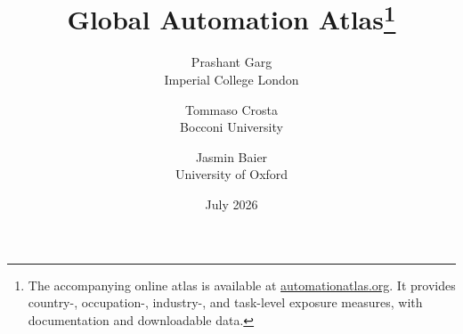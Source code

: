 \documentclass[11pt]{article}
\title{Global Automation Atlas\thanks{The accompanying online atlas is available at \href{https://automationatlas.org}{automationatlas.org}. It provides country-, occupation-, industry-, and task-level exposure measures, with documentation and downloadable data.}}
\date{July 2026}
\author{Prashant Garg\\Imperial College London
\and Tommaso Crosta\\Bocconi University
\and Jasmin Baier\\University of Oxford}
\begin{document}
\maketitle

\begin{abstract}
\noindent

\noindent

\noindent



\end{abstract}
\end{document}
